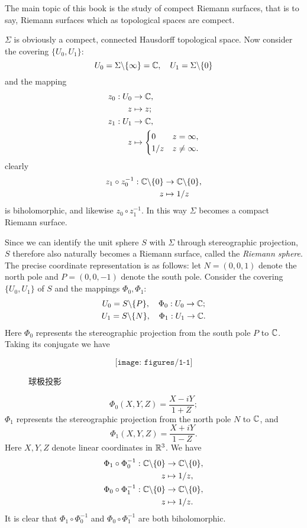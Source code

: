 The main topic of this book is the study of compect Riemann surfaces, that is to say, Riemann surfaces which as topological spaces are compect. 
\begin{example}[The set of extended complex numbers $\Sigma=\C\cup\{\infty\}$ (one point compactification of complex numbers)]
    $\Sigma$ is obviously a compect, connected Hausdorff topological space. Now consider the covering $\{U_0,U_1\}$: 
    \[U_0=\Sigma\backslash\{\infty\}=\mathbb{C}, \quad U_1=\Sigma\backslash\{0\}\]
    and the mapping 
    \begin{align*}
        z_0:U_0&\to\mathbb{C}, \\
        z&\mapsto z; \\
        z_1:U_1&\to\mathbb{C}, \\
        z&\mapsto\begin{cases}
            0&z=\infty, \\
            1/z&z\neq\infty. 
        \end{cases}
    \end{align*}
    clearly
    \begin{align*}
        z_1\circ z_0^{-1}:\mathbb{C}\backslash\{0\}&\to\mathbb{C}\backslash\{0\}, \\
        z&\mapsto1/z
    \end{align*}
    is biholomorphic, and likewise $z_0\circ z_1^{-1}$. In this way $\Sigma$ becomes a compact Riemann surface. 

    Since we can identify the unit sphere $S$ with $\Sigma$ through stereographic projection, $S$ therefore also naturally becomes a Riemann surface, called the \textit{Riemann sphere}. The precise coordinate representation is as follows: let $N=(0,0,1)$ denote the north pole and $P=(0,0,-1)$ denote the south pole. Consider the covering $\{U_0,U_1\}$ of $S$ and the mappings $\Phi_0,\Phi_1$: 
    \begin{gather*}
        U_0=S\backslash\{P\}, \quad\Phi_0:U_0\to\mathbb{C}; \\
        U_1=S\backslash\{N\}, \quad\Phi_1:U_1\to\mathbb{C}. 
    \end{gather*}
    Here $\Phi_0$ represents the stereographic projection from the south pole $P$ to $\mathbb{C}$. Taking its conjugate we have 
    \begin{figure}[h]
        \[\texttt{[image: figures/1-1]}\]
        \caption{球极投影}
    \end{figure}
    \[\Phi_0(X,Y,Z)=\frac{X-iY}{1+Z}; \]
    $\Phi_1$ represents the stereographic projection from the north pole $N$ to $\mathbb{C}$, and 
    \[\Phi_1(X,Y,Z)=\frac{X+iY}{1-Z}. \]
    Here $X,Y,Z$ denote linear coordinates in $\mathbb{R}^3$. We have 
    \begin{align*}
        \Phi_1\circ\Phi_0^{-1}:\mathbb{C}\backslash\{0\}&\to\mathbb{C}\backslash\{0\}, \\
        z&\mapsto1/z, \\
        \Phi_0\circ\Phi_1^{-1}:\mathbb{C}\backslash\{0\}&\to\mathbb{C}\backslash\{0\}, \\
        z&\mapsto1/z. 
    \end{align*}
    It is clear that $\Phi_1\circ\Phi_0^{-1}$ and $\Phi_0\circ\Phi_1^{-1}$ are both biholomorphic. 


\end{example}
